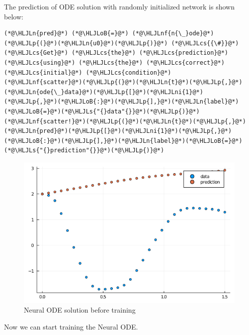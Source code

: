 \documentclass[12pt,a4paper]{article}
\newcommand{\HLJLn}[1]{#1}
\newcommand{\HLJLnf}[1]{\textcolor[RGB]{66,102,213}{#1}}
\newcommand{\HLJLs}[1]{\textcolor[RGB]{201,61,57}{#1}}
\newcommand{\HLJLni}[1]{\textcolor[RGB]{59,151,46}{#1}}
\newcommand{\HLJLoB}[1]{\textcolor[RGB]{102,102,102}{\textbf{#1}}}
\newcommand{\HLJLp}[1]{#1}
\newcommand{\HLJLcs}[1]{\textcolor[RGB]{153,153,119}{\textit{#1}}}
\begin{document}
The prediction of ODE solution with randomly initialized network is shown below:


\begin{lstlisting}
(*@\HLJLn{pred}@*) (*@\HLJLoB{=}@*) (*@\HLJLnf{n{\_}ode}@*)(*@\HLJLp{(}@*)(*@\HLJLn{u0}@*)(*@\HLJLp{)}@*) (*@\HLJLcs{{\#}}@*) (*@\HLJLcs{Get}@*) (*@\HLJLcs{the}@*) (*@\HLJLcs{prediction}@*) (*@\HLJLcs{using}@*) (*@\HLJLcs{the}@*) (*@\HLJLcs{correct}@*) (*@\HLJLcs{initial}@*) (*@\HLJLcs{condition}@*)
(*@\HLJLnf{scatter}@*)(*@\HLJLp{(}@*)(*@\HLJLn{t}@*)(*@\HLJLp{,}@*)(*@\HLJLn{ode{\_}data}@*)(*@\HLJLp{[}@*)(*@\HLJLni{1}@*)(*@\HLJLp{,}@*)(*@\HLJLoB{:}@*)(*@\HLJLp{],}@*)(*@\HLJLn{label}@*)(*@\HLJLoB{=}@*)(*@\HLJLs{"{}data"{}}@*)(*@\HLJLp{)}@*)
(*@\HLJLnf{scatter!}@*)(*@\HLJLp{(}@*)(*@\HLJLn{t}@*)(*@\HLJLp{,}@*)(*@\HLJLn{pred}@*)(*@\HLJLp{[}@*)(*@\HLJLni{1}@*)(*@\HLJLp{,}@*)(*@\HLJLoB{:}@*)(*@\HLJLp{],}@*)(*@\HLJLn{label}@*)(*@\HLJLoB{=}@*)(*@\HLJLs{"{}prediction"{}}@*)(*@\HLJLp{)}@*)
\end{lstlisting}

\begin{figure}
\centering
\includegraphics{img/node_before.png}
\caption{Neural ODE solution before training}
\end{figure}


Now we can start training the Neural ODE.
\end{document}
